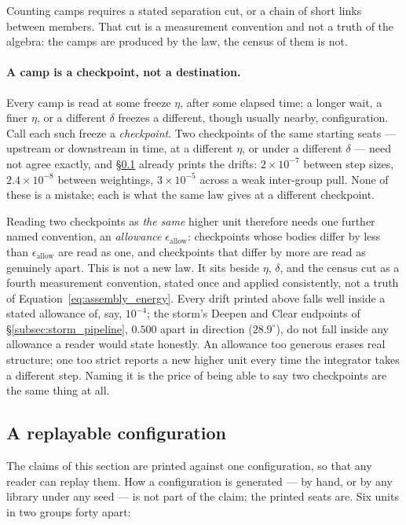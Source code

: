 \documentclass[12pt, a4paper]{article}
\begin{document}
Counting camps requires a stated separation cut, or a chain of short
links between members. That cut is a measurement convention and not
a truth of the algebra: the camps are produced by the law, the
census of them is not.

\paragraph{A camp is a checkpoint, not a destination.}
Every camp is read at some freeze $\eta$, after some elapsed time; a
longer wait, a finer $\eta$, or a different $\delta$ freezes a
different, though usually nearby, configuration. Call each such
freeze a \emph{checkpoint}. Two checkpoints of the same starting
seats --- upstream or downstream in time, at a different $\eta$, or
under a different $\delta$ --- need not agree exactly, and
\S\ref{subsec:enclosure_replay} already prints the drifts: $2\times
10^{-7}$ between step sizes, $2.4\times10^{-8}$ between weightings,
$3\times10^{-5}$ across a weak inter-group pull. None of these is a
mistake; each is what the same law gives at a different checkpoint.

Reading two checkpoints as \emph{the same} higher unit therefore
needs one further named convention, an \emph{allowance}
$\epsilon_{\text{allow}}$: checkpoints whose bodies differ by less
than $\epsilon_{\text{allow}}$ are read as one, and checkpoints that
differ by more are read as genuinely apart. This is not a new law.
It sits beside $\eta$, $\delta$, and the census cut as a fourth
measurement convention, stated once and applied consistently, not a
truth of Equation~\eqref{eq:assembly_energy}. Every drift printed
above falls well inside a stated allowance of, say, $10^{-4}$; the
storm's Deepen and Clear endpoints of \S\ref{subsec:storm_pipeline},
$0.500$ apart in direction ($28.9^\circ$), do not fall inside any
allowance a reader would state honestly. An allowance too generous
erases real structure; one too strict reports a new higher unit
every time the integrator takes a different step. Naming it is the
price of being able to say two checkpoints are the same thing at
all.

\subsection{A replayable configuration}
\label{subsec:enclosure_replay}
The claims of this section are printed against one configuration, so
that any reader can replay them. How a configuration is generated ---
by hand, or by any library under any seed --- is not part of the
claim; the printed seats are. Six units in two groups forty apart:
\end{document}
